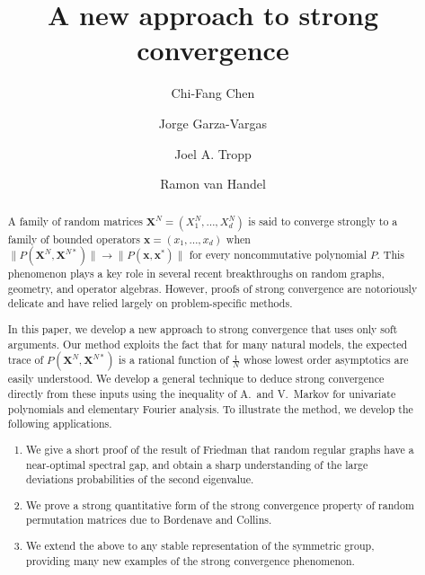 \documentclass[10pt,reqno]{amsart}
\theoremstyle{definition}
\theoremstyle{remark}
\numberwithin{equation}{section}
\numberwithin{figure}{section}
\numberwithin{table}{section}
\begin{document}
\title{\vspace*{-1cm}
A new approach to strong convergence}

\author[Chen]{Chi-Fang Chen}
\address{EECS, University of California, Berkeley, CA 94720, USA
\newline\indent
Center for Theoretical Physics, Massachusetts Institute of 
Technology, Cambridge, MA 02139, USA}

\author[Garza-Vargas]{Jorge Garza-Vargas}
\address{Department of Computing and Mathematical Sciences, 
California Institute of Technology, Pasadena, CA, USA}

\author[Tropp]{Joel A. Tropp}
\address{Department of Computing and Mathematical Sciences, 
California Institute of Technology, Pasadena, CA, USA}

\author[Van Handel]{Ramon van Handel}
\address{Department of Mathematics, Princeton University, 
Princeton, NJ 08544, USA}

\begin{abstract}
A family of random matrices $\boldsymbol{X}^N=(X_1^N,\ldots,X_d^N)$ 
is said to converge strongly to a family of bounded operators 
$\boldsymbol{x}=(x_1,\ldots,x_d)$ when
$\|P(\boldsymbol{X}^N,\boldsymbol{X}^{N*})\|\to\|P(\boldsymbol{x}, 
\boldsymbol{x}^*)\|$ for every noncommutative polynomial $P$. This 
phenomenon plays a key role in several recent breakthroughs on 
random graphs, geometry, and operator algebras. 
However, proofs of strong convergence are notoriously delicate and have
relied largely on problem-specific methods.

In this paper, we develop a new approach to strong convergence that uses 
only soft arguments. Our method exploits the fact that for many natural 
models, the expected trace of $P(\boldsymbol{X}^N,\boldsymbol{X}^{N*})$ 
is a rational function 
of $\frac{1}{N}$ whose lowest order asymptotics are easily understood. We 
develop a general technique to deduce strong convergence directly from 
these inputs using the inequality of A.\ and V.~Markov for univariate 
polynomials and elementary Fourier analysis.
To illustrate the method, we develop the following applications.
\vspace*{.5mm}
\begin{enumerate}[leftmargin=*,label=\arabic*.]
\addtolength{\itemsep}{.5mm}
\item We give a short proof of the result of 
Friedman that random regular graphs have a near-optimal spectral gap,
and obtain a sharp understanding of the large deviations 
probabilities of the second eigenvalue.
\item We prove a strong quantitative form of the strong convergence
property of random permutation matrices due to Bordenave and Collins.
\item We extend the above to any
stable representation
of the symmetric group, providing many new examples of the strong 
convergence phenomenon.
\end{enumerate}
\end{abstract}
\end{document}
